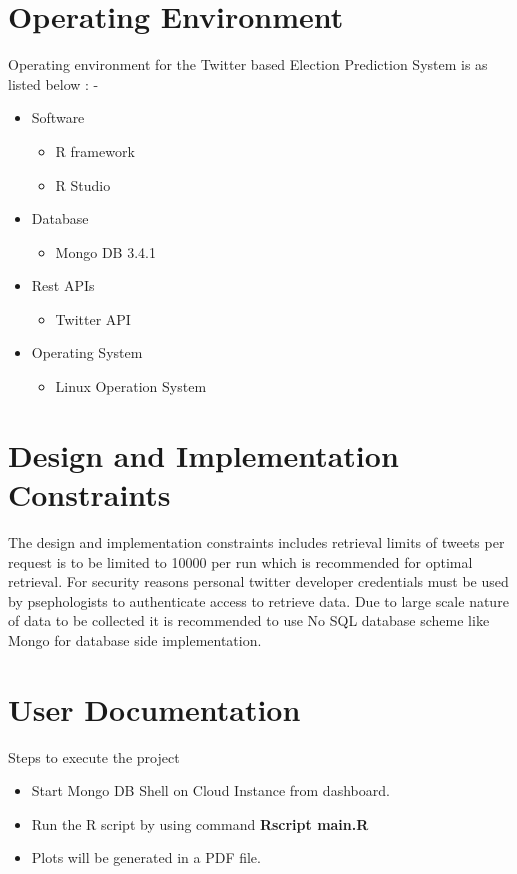 \documentclass{scrreprt}
\begin{document}
\section{Operating Environment}
Operating environment for the Twitter based Election Prediction System is as listed below : -
\begin{itemize}
	\item Software
		\begin{itemize}
			\item R framework
			\item R Studio
		\end{itemize}
	\item Database
		\begin{itemize}
			\item Mongo DB 3.4.1
		\end{itemize}
	\item Rest APIs
		\begin{itemize}
			\item Twitter API
		\end{itemize}
	\item Operating System
		\begin{itemize}
			\item Linux Operation System
		\end{itemize}
\end{itemize}


\section{Design and Implementation Constraints}

The design and implementation constraints includes retrieval limits of tweets per request is to be limited to 10000 per run which is recommended for optimal retrieval.
For security reasons personal twitter developer credentials must be used by psephologists to authenticate access to retrieve data.
Due to large scale nature of data to be collected it is recommended to use No SQL database scheme like Mongo for database side implementation.


\section{User Documentation}
Steps to execute the project
\begin{itemize}
	\item Start Mongo DB Shell on Cloud Instance from dashboard.
	\item Run the R script by using command \textbf{Rscript main.R}
	\item Plots will be generated in a PDF file.
\end{itemize}
\end{document}
